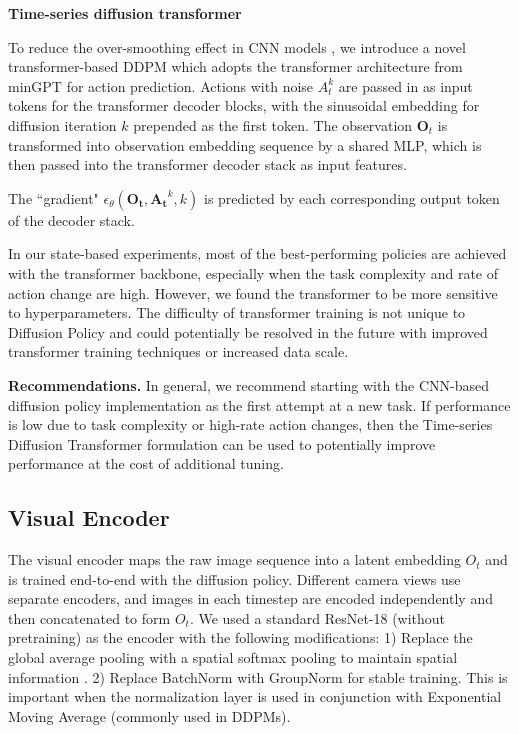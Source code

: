\textbf{Time-series diffusion transformer}

To reduce the over-smoothing effect in CNN models \cite{tancik2020fourier}, we introduce a novel transformer-based DDPM which adopts the transformer architecture from minGPT \cite{bet} for action prediction. 
Actions with noise $A_t^k$ are passed in as input tokens for the transformer decoder blocks, with the sinusoidal embedding for diffusion iteration $k$ prepended as the first token. 
The observation $\mathbf{O}_t$ is transformed into observation embedding sequence by a shared MLP, which is then passed into the transformer decoder stack as input features.

The ``gradient" $\epsilon_\theta(\mathbf{O_t},\mathbf{A_t}^k,k)$ is predicted by each corresponding output token of the decoder stack. 

In our state-based experiments, most of the best-performing policies are achieved with the transformer backbone, especially when the task complexity and rate of action change are high. However, we found the transformer to be more sensitive to hyperparameters. The difficulty of transformer training \cite{liu2020understanding} is not unique to Diffusion Policy and could potentially be resolved in the future with improved transformer training techniques or increased data scale.

\textbf{Recommendations.} 
 In general, we recommend starting with the CNN-based diffusion policy implementation as the first attempt at a new task. If performance is low due to task complexity or high-rate action changes, then the Time-series Diffusion Transformer formulation can be used to potentially improve performance at the cost of additional tuning. 

\subsection{Visual Encoder}
\label{sec:method-visual}
The visual encoder  maps the raw image sequence into a latent embedding $O_t$ and is trained end-to-end with the diffusion policy. 
Different camera views use separate encoders, and images in each timestep are encoded independently and then concatenated to form $O_t$.  
We used a standard ResNet-18 (without pretraining) as the encoder with the following modifications: 
1) Replace the global average pooling with a spatial softmax pooling to maintain spatial information \cite{robomimic}. 
2) Replace BatchNorm with GroupNorm \cite{groupnorm} for stable training. This is important when the normalization layer is used in conjunction with Exponential Moving Average \cite{he2020moco} (commonly used in DDPMs). 

